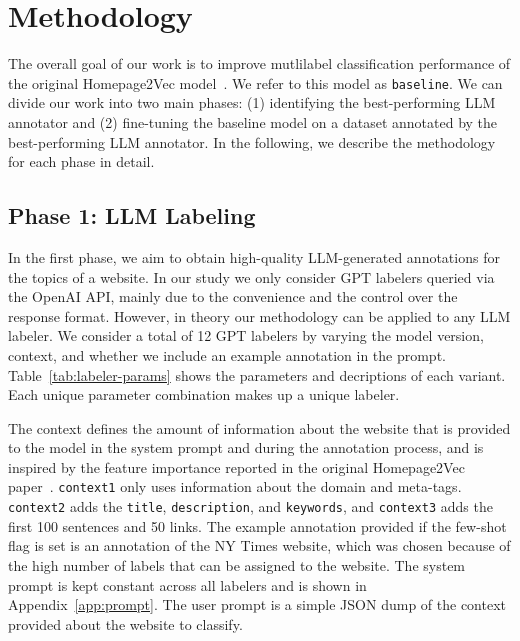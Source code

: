 \section{Methodology}
\label{sec:methodology}

The overall goal of our work is to improve mutlilabel classification performance of the original Homepage2Vec model~\cite{homepage2vec}. We refer to this model as \texttt{baseline}. We can divide our work into two main phases: (1) identifying the best-performing LLM annotator and (2) fine-tuning the baseline model on a dataset annotated by the best-performing LLM annotator. In the following, we describe the methodology for each phase in detail.

\subsection*{Phase 1: LLM Labeling}



In the first phase, we aim to obtain high-quality LLM-generated annotations for the topics of a website. 
In our study we only consider GPT labelers queried via the OpenAI API, mainly due to the convenience and the control over the response format. However, in theory our methodology can be applied to any LLM labeler. We consider a total of 12 GPT labelers by varying the model version, context, and whether we include an example annotation in the prompt. Table~\ref{tab:labeler-params} shows the parameters and decriptions of each variant. Each unique parameter combination makes up a unique labeler.

The context defines the amount of information about the website that is provided to the model in the system prompt and during the annotation process, and is inspired by the feature importance reported in the original Homepage2Vec paper~\cite{homepage2vec}. \texttt{context1} only uses information about the domain and meta-tags. \texttt{context2} adds the \texttt{title}, \texttt{description}, and \texttt{keywords}, and \texttt{context3} adds the first 100 sentences and 50 links. The example annotation provided if the few-shot flag is set is an annotation of the NY Times website, which was chosen because of the high number of labels that can be assigned to the website. The system prompt is kept constant across all labelers and is shown in Appendix~\ref{app:prompt}. The user prompt is a simple JSON dump of the context provided about the website to classify.

